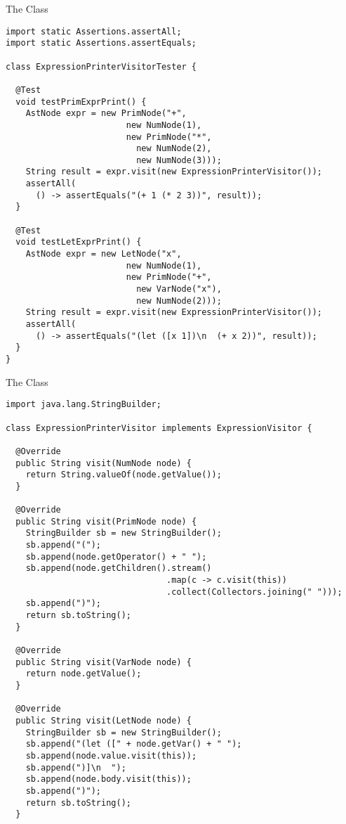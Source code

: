 \begin{verbnobox}[\footnotesize]
\begin{cl}[]{The  Class}
\begin{lstlisting}[language=MyJava]
import static Assertions.assertAll;
import static Assertions.assertEquals;

class ExpressionPrinterVisitorTester {

  @Test
  void testPrimExprPrint() {
    AstNode expr = new PrimNode("+", 
                        new NumNode(1), 
                        new PrimNode("*", 
                          new NumNode(2), 
                          new NumNode(3)));
    String result = expr.visit(new ExpressionPrinterVisitor());
    assertAll(
      () -> assertEquals("(+ 1 (* 2 3))", result));
  }

  @Test
  void testLetExprPrint() {
    AstNode expr = new LetNode("x", 
                        new NumNode(1), 
                        new PrimNode("+", 
                          new VarNode("x"), 
                          new NumNode(2)));
    String result = expr.visit(new ExpressionPrinterVisitor());
    assertAll(
      () -> assertEquals("(let ([x 1])\n  (+ x 2))", result));
  }
}
\end{lstlisting}
\end{cl}

\begin{cl}[]{The  Class}
\begin{lstlisting}[language=MyJava]
import java.lang.StringBuilder; 

class ExpressionPrinterVisitor implements ExpressionVisitor {

  @Override
  public String visit(NumNode node) {
    return String.valueOf(node.getValue());
  }
  
  @Override
  public String visit(PrimNode node) {
    StringBuilder sb = new StringBuilder();
    sb.append("(");
    sb.append(node.getOperator() + " ");
    sb.append(node.getChildren().stream()
                                .map(c -> c.visit(this))
                                .collect(Collectors.joining(" ")));
    sb.append(")");
    return sb.toString();
  }
  
  @Override
  public String visit(VarNode node) {
    return node.getValue();
  }
  
  @Override
  public String visit(LetNode node) {
    StringBuilder sb = new StringBuilder();
    sb.append("(let ([" + node.getVar() + " ");
    sb.append(node.value.visit(this));
    sb.append(")]\n  ");
    sb.append(node.body.visit(this));
    sb.append(")");
    return sb.toString();
  }
  

\end{lstlisting}
\end{cl}
\end{verbnobox}
